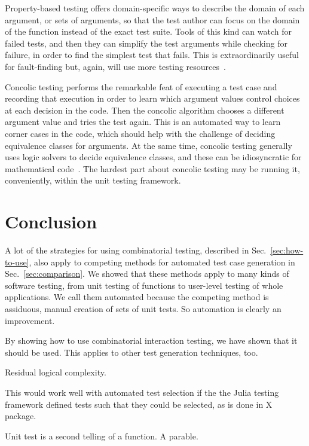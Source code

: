 \documentclass{juliacon}
\begin{document}
\vskip 6pt
Property-based testing offers domain-specific ways to describe the domain of each argument, or sets of arguments, so that the test author can focus on the domain of the function instead of the exact test suite. Tools of this kind can watch for failed tests, and then they can simplify the test arguments while checking for failure, in order to find the simplest test that fails. This is extraordinarily useful for fault-finding but, again, will use more testing resources~\cite{loscher2018automating}.

\vskip 6pt
Concolic testing performs the remarkable feat of executing a test case and recording that execution in order to learn which argument values control choices at each decision in the code. Then the concolic algorithm chooses a different argument value and tries the test again. This is an automated way to learn corner cases in the code, which should help with the challenge of deciding equivalence classes for arguments. At the same time, concolic testing generally uses logic solvers to decide equivalence classes, and these can be idiosyncratic for mathematical code~\cite{King1976-jt,Wang2018-xh}. The hardest part about concolic testing may be running it, conveniently, within the unit testing framework.

\section{Conclusion}
A lot of the strategies for using combinatorial testing, described in Sec.~\ref{sec:how-to-use}, also apply to competing methods for automated test case generation in Sec.~\ref{sec:comparison}. We showed that these methods apply to many kinds of software testing, from unit testing of functions to user-level testing of whole applications. We call them automated because the competing method is assiduous, manual creation of sets of unit tests. So automation is clearly an improvement.

\vskip 6pt
By showing how to use combinatorial interaction testing, we have shown that it should be used. This applies to other test generation techniques, too.

\vskip 6pt
Residual logical complexity.



\vskip 6pt
This would work well with automated test selection if the the Julia testing framework defined tests such that they could be selected, as is done in X package.


\vskip 6pt
Unit test is a second telling of a function. A parable.


\end{document}
